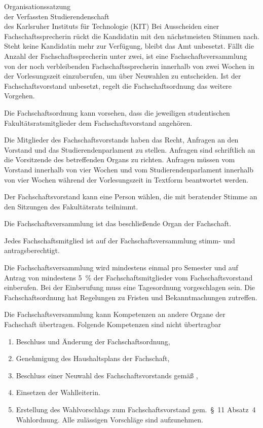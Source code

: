 \begin{jurdoc}[Organisationssatzung]{Organisationssatzung\\der Verfassten Studierendenschaft\\des Karlsruher Instituts für Technologie (KIT)}
Bei Ausscheiden einer Fach\-schafts\-sprecherin rückt die Kandidatin mit den nächstmeisten Stimmen nach. Steht keine Kandidatin mehr zur Verfügung, bleibt das Amt unbesetzt. Fällt die Anzahl der Fach\-schafts\-sprecherin unter zwei, ist eine Fach\-schafts\-versammlung von der noch verbleibenden Fach\-schafts\-sprecherin innerhalb von zwei Wochen in der Vorlesungszeit einzuberufen, um über Neuwahlen zu entscheiden. Ist der Fach\-schafts\-vorstand unbesetzt, regelt die Fach\-schafts\-ordnung das weitere Vorgehen.

Die Fach\-schafts\-ordnung kann vorsehen, dass die jeweiligen studentischen Fakultätsratsmitglieder dem Fachschaftsvorstand angehören.

Die Mitglieder des Fachschaftsvorstands haben das Recht, Anfragen an den  Vorstand und das Studierendenparlament zu stellen. Anfragen sind  schriftlich an die Vorsitzende des betreffenden Organs zu richten.  Anfragen müssen vom Vorstand innerhalb von vier Wochen und vom Studierendenparlament innerhalb von vier Wochen während der Vorlesungszeit in Textform beantwortet werden.

Der Fachschaftsvorstand kann eine Person wählen, die mit beratender Stimme an den Sitzungen des Fakultätsrats teilnimmt.


\label{fachschaft:vv}

Die Fachschaftsversammlung ist das beschließende Organ der Fachschaft.

Jedes Fachschaftsmitglied ist auf der Fachschaftsversammlung stimm- und antragsberechtigt.

Die Fachschaftsversammlung wird mindestens einmal pro Semester und auf Antrag von mindestens 5~\% der Fach\-schaftsmitglieder vom Fachschaftsvorstand einberufen. Bei der Einberufung muss eine Tagesordnung vorgeschlagen sein. Die Fachschaftsordnung hat Regelungen zu Fristen und Bekanntmachungen zutreffen.

Die Fachschaftsversammlung kann Kompetenzen an andere Organe der Fachschaft übertragen. Folgende Kompetenzen sind nicht übertragbar \label{fachschaft:vv:kompetenzen}
  \begin{enumerate}
  \item Beschluss und Änderung der Fachschaftsordnung,
  \item Genehmigung des Haushaltsplans der Fachschaft,
  \item Beschluss einer Neuwahl des Fachschaftsvorstands gemäß , \label{fachschaft:vv:kompetenzen:abwahl}
  \item Einsetzen der Wahlleiterin.\label{fachschaft:vv:wahlleiter}
  \item Erstellung des Wahlvorschlags zum Fachschaftsvorstand gem.\ §~11 Absatz~4 Wahlordnung. Alle zulässigen Vorschläge sind aufzunehmen.
  \end{enumerate}


\end{jurdoc}
